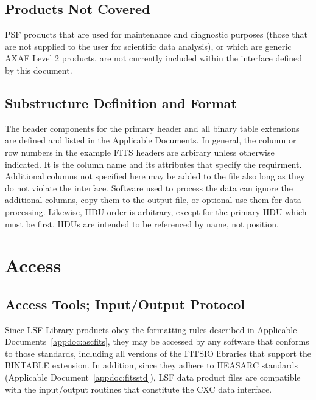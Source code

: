 \documentclass[twoside]{article}
\begin{document}
\subsection{Products Not Covered}

PSF products that are used for maintenance and diagnostic purposes
(those that are not supplied to the user for scientific data
analysis), or which are generic AXAF Level 2 products, are not
currently included within the interface defined by this document.

\subsection{Substructure Definition and Format}

The header components for the primary header and all binary table
extensions are defined and listed in the Applicable Documents. In 
general, the column or row numbers in the example FITS headers 
are arbirary unless otherwise indicated. It is the column name and
its attributes that specify the requirment. Additional columns not
specified here may be added to the file also long as they do not 
violate the interface. Software used to process the data can 
ignore the additional columns, copy them to the output file, or
optional use them for data processing. Likewise, HDU order is 
arbitrary, except for the primary HDU which must be first. HDUs
are intended to be referenced by name, not position. 

\section{Access}
\subsection{Access Tools; Input/Output Protocol}

Since LSF Library products obey the formatting rules described in
Applicable Documents~\ref{appdoc:ascfits},
they may be accessed by any software that conforms to those standards,
including all versions of the FITSIO libraries that support the
BINTABLE extension. In addition, since they adhere to HEASARC
standards (Applicable Document~\ref{appdoc:fitsstd}), LSF data product
files are compatible with the input/output routines that constitute
the CXC data interface.

\end{document}
